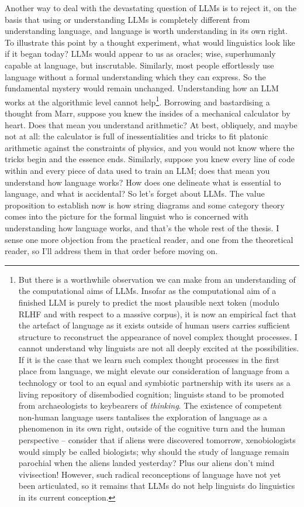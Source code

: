 Another way to deal with the devastating question of LLMs is to reject it, on the basis that using or understanding LLMs is completely different from understanding language, and language is worth understanding in its own right. To illustrate this point by a thought experiment, what would linguistics look like if it began today? LLMs would appear to us as oracles; wise, superhumanly capable at language, but inscrutable. Similarly, most people effortlessly use language without a formal understanding which they can express. So the fundamental mystery would remain unchanged. Understanding how an LLM works at the algorithmic level cannot help\footnote{But there is a worthwhile observation we can make from an understanding of the computational aims of LLMs. Insofar as the computational aim of a finished LLM is purely to predict the most plausible next token (modulo RLHF and with respect to a massive corpus), it is now an empirical fact that the artefact of language as it exists outside of human users carries sufficient structure to reconstruct the appearance of novel complex thought processes. I cannot understand why linguists are not all deeply excited at the possibilities. If it is the case that we learn such complex thought processes in the first place from language, we might elevate our consideration of language from a technology or tool to an equal and symbiotic partnership with its users as a living repository of disembodied cognition; linguists stand to be promoted from archaeologists to keybearers of \emph{thinking}. The existence of competent non-human language users tantalises the exploration of language as a phenomenon in its own right, outside of the cognitive turn and the human perspective -- consider that if aliens were discovered tomorrow, xenobiologists would simply be called biologists; why should the study of language remain parochial when the aliens landed yesterday? Plus our aliens don't mind vivisection! However, such radical reconceptions of language have not yet been articulated, so it remains that LLMs do not help linguists do linguistics in its current conception.}. Borrowing and bastardising a thought from Marr, suppose you knew the insides of a mechanical calculator by heart. Does that mean you understand arithmetic? At best, obliquely, and maybe not at all: the calculator is full of inessentialities and tricks to fit platonic arithmetic against the constraints of physics, and you would not know where the tricks begin and the essence ends. Similarly, suppose you knew every line of code within and every piece of data used to train an LLM; does that mean you understand how language works? How does one delineate what is essential to language, and what is accidental? So let's forget about LLMs. The value proposition to establish now is how string diagrams and some category theory comes into the picture for the formal linguist who is concerned with understanding how language works, and that's the whole rest of the thesis. I sense one more objection from the practical reader, and one from the theoretical reader, so I'll address them in that order before moving on.

